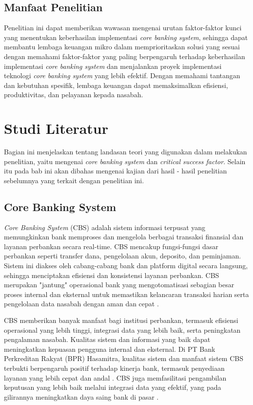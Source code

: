\documentclass[journal,article,submit,pdftex,moreauthors]{Definitions/mdpi}
\begin{document}
\subsection{Manfaat Penelitian}
Penelitian ini dapat memberikan wawasan mengenai urutan faktor-faktor kunci yang menentukan keberhasilan implementasi \textit{core banking system}, sehingga dapat membantu lembaga keuangan mikro dalam memprioritaskan solusi yang sesuai dengan memahami faktor-faktor yang paling berpengaruh terhadap keberhasilan implementasi \textit{core banking system} dan menjalankan proyek implementasi teknologi \textit{core banking system} yang lebih efektif. Dengan memahami tantangan dan kebutuhan spesifik, lembaga keuangan dapat memaksimalkan efisiensi, produktivitas, dan pelayanan kepada nasabah.



\section{Studi Literatur} \label{sec:Studi Literatrur}

Bagian ini menjelaskan tentang landasan teori yang digunakan dalam melakukan penelitian, yaitu mengenai \textit{core banking system} dan \textit{critical success factor}. Selain itu pada bab ini akan dibahas mengenai kajian dari hasil - hasil penelitian sebelumnya yang terkait dengan penelitian ini.

\subsection{Core Banking System} \label{sec:Core Banking System}

\textit{Core Banking System} (CBS) adalah sistem informasi terpusat yang memungkinkan bank memproses dan mengelola berbagai transaksi finansial dan layanan perbankan secara real-time. CBS mencakup fungsi-fungsi dasar perbankan seperti transfer dana, pengelolaan akun, deposito, dan peminjaman. Sistem ini diakses oleh cabang-cabang bank dan platform digital secara langsung, sehingga menciptakan efisiensi dan konsistensi layanan perbankan. CBS merupakan "jantung" operasional bank yang mengotomatisasi sebagian besar proses internal dan eksternal untuk memastikan kelancaran transaksi harian serta pengelolaan data nasabah dengan aman dan cepat \cite{Hsiao-ebanking}.


CBS memberikan banyak manfaat bagi institusi perbankan, termasuk efisiensi operasional yang lebih tinggi, integrasi data yang lebih baik, serta peningkatan pengalaman nasabah. Kualitas sistem dan informasi yang baik dapat meningkatkan kepuasan pengguna internal dan eksternal. Di PT Bank Perkreditan Rakyat (BPR) Hasamitra, kualitas sistem dan manfaat sistem CBS terbukti berpengaruh positif terhadap kinerja bank, termasuk penyediaan layanan yang lebih cepat dan andal \cite{basyir-cbs}. CBS juga memfasilitasi pengambilan keputusan yang lebih baik melalui integrasi data yang efektif, yang pada gilirannya meningkatkan daya saing bank di pasar \cite{pratama-cbs}.
\end{document}
